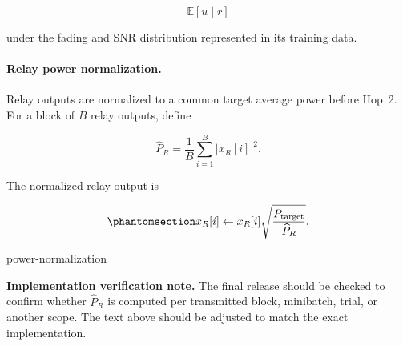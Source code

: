 \[
\mathbb{E}[u\mid r]
\]

under the fading and SNR distribution represented in its training
data.


\paragraph{Relay power normalization.}

Relay outputs are normalized to a common target average power before
Hop~2. For a block of $B$ relay outputs, define

\[
\widehat P_R
=
\frac{1}{B}
\sum_{i=1}^{B}
|x_R[i]|^2.
\]

The normalized relay output is

\begin{equation}\protect\phantomsection\label{eq:power-normalization}
x_R[i]
\leftarrow
x_R[i]
\sqrt{
\frac{P_{\mathrm{target}}}
{\widehat P_R}
}.
\end{equation}
{\protect\numberline{\theequation}\quad power-normalization}

\textbf{Implementation verification note.}
The final release should be checked to confirm whether
$\widehat P_R$ is computed per transmitted block, minibatch, trial, or
another scope. The text above should be adjusted to match the exact
implementation.


